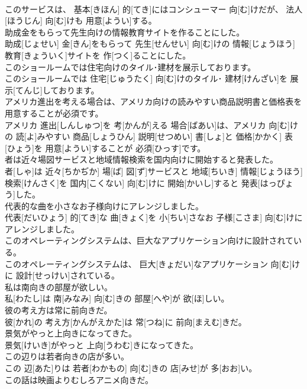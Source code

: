 \documentclass[8pt]{extreport}
\begin{document}
\begin{CJK}{UTF8}{min}
\\	このサービスは、 基本[きほん] 的[てき]にはコンシューマー 向[む]けだが、 法人[ほうじん] 向[む]けも 用意[ようい]する。
\\	助成金をもらって先生向けの情報教育サイトを作ることにした。	
\\	助成[じょせい] 金[きん]をもらって 先生[せんせい] 向[む]けの 情報[じょうほう] 教育[きょういく]サイトを 作[つく]ることにした。
\\	このショールームでは住宅向けのタイル･建材を展示しております。	
\\	このショールームでは 住宅[じゅうたく] 向[む]けのタイル･ 建材[けんざい]を 展示[てんじ]しております。
\\	アメリカ進出を考える場合は、アメリカ向けの読みやすい商品説明書と価格表を用意することが必須です。	
\\	アメリカ 進出[しんしゅつ]を 考[かんが]える 場合[ばあい]は、アメリカ 向[む]けの 読[よ]みやすい 商品[しょうひん] 説明[せつめい] 書[しょ]と 価格[かかく] 表[ひょう]を 用意[ようい]することが 必須[ひっす]です。
\\	者は近々場図サービスと地域情報検索を国内向けに開始すると発表した。	
\\	者[しゃ]は 近々[ちかぢか] 場[ば] 図[ず]サービスと 地域[ちいき] 情報[じょうほう] 検索[けんさく]を 国内[こくない] 向[む]けに 開始[かいし]すると 発表[はっぴょう]した。
\\	代表的な曲を小さなお子様向けにアレンジしました。	
\\	代表[だいひょう] 的[てき]な 曲[きょく]を 小[ちい]さなお 子様[こさま] 向[む]けにアレンジしました。
\\	このオペレーティングシステムは、巨大なアプリケーション向けに設計されている。	
\\	このオペレーティングシステムは、 巨大[きょだい]なアプリケーション 向[む]けに 設計[せっけい]されている。
\\	私は南向きの部屋が欲しい。	
\\	私[わたし]は 南[みなみ] 向[む]きの 部屋[へや]が 欲[ほ]しい。
\\	彼の考え方は常に前向きだ。	
\\	彼[かれ]の 考え方[かんがえかた]は 常[つね]に 前向[まえむ]きだ。
\\	景気がやっと上向きになってきた。	
\\	景気[けいき]がやっと 上向[うわむ]きになってきた。
\\	この辺りは若者向きの店が多い。	
\\	この 辺[あた]りは 若者[わかもの] 向[む]きの 店[みせ]が 多[おお]い。
\\	この話は映画よりむしろアニメ向きだ。	

\end{CJK}
\end{document}
